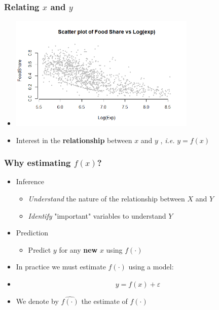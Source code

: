 \documentclass[xcolor=x11names,compress, aspectratio=169]{beamer}
\renewcommand{\(}{\begin{columns}}
\renewcommand{\)}{\end{columns}}
\newcommand{\<}[1]{\begin{column}{#1}}
\renewcommand{\>}{\end{column}}
\begin{document}
\begin{frame} %
\frametitle{Relating $x$ and $y$ }
 \begin{itemize}
  \item<+->[] \includegraphics[width = 0.7\textwidth]{M0-Scatter-1.png}
  \item<+->[]  Interest in the \textbf{relationship} between $x$ and $y$ ,  \emph{i.e.} \textbf{$ y = f(x)$}
 \end{itemize}
\end{frame}




\begin{frame} %
\frametitle{Why estimating $f(x)$?}

\pause

 \begin{itemize}
  \item<+-> Inference
   \begin{itemize}
  \item<+->[] \textit{Understand} the nature of the relationship between $X$ and $Y$
  \item<+->[] \textit{Identify}  "important" variables to understand $Y$
 \end{itemize}
  \item<+-> Prediction
   \begin{itemize}
  \item<+->[] Predict $y$ for any \textbf{new} $x$ using $f(\cdot)$
 \end{itemize}
 \item<+-> In practice we must estimate  $f(\cdot)$ using a model:
 \item<+->[] $$ y = f(x) + \varepsilon $$
 \item<+->[] We denote by $\widehat{f(\cdot)}$ the estimate of $f(\cdot)$
 \end{itemize}
\end{frame}
\end{document}
